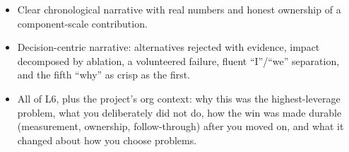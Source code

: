 \begin{interviewq}
\goodgreat
\begin{itemize}
    \item {} Clear chronological narrative with real numbers and honest ownership of a component-scale contribution.
    \item {} Decision-centric narrative: alternatives rejected with evidence, impact decomposed by ablation, a volunteered failure, fluent ``I''/``we'' separation, and the fifth ``why'' as crisp as the first.
    \item {} All of L6, plus the project's org context: why this was the highest-leverage problem, what you deliberately did not do, how the win was made durable (measurement, ownership, follow-through) after you moved on, and what it changed about how you choose problems.
\end{itemize}

\end{interviewq}


